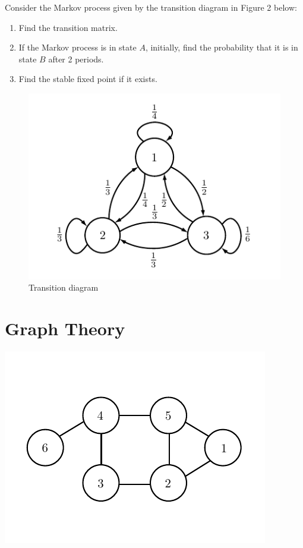\begin{problem}
Consider the Markov process given by the transition diagram in Figure 2 below:
\begin{enumerate}
\item Find the transition matrix.
\item If the Markov process is in state $A$, initially, find the probability that it is in state $B$ after 2 periods.
\item Find the stable fixed point if it exists.
\end{enumerate}
\end{problem}

\begin{figure}[h!]
\begin{center}
\includegraphics[scale = 1]{./Figures/markov2}
\end{center}
\caption{Transition diagram}
\end{figure}

\newpage

\section*{Graph Theory}
\begin{center}
\includegraphics[scale = .8]{./Figures/graphExample}
\end{center}

